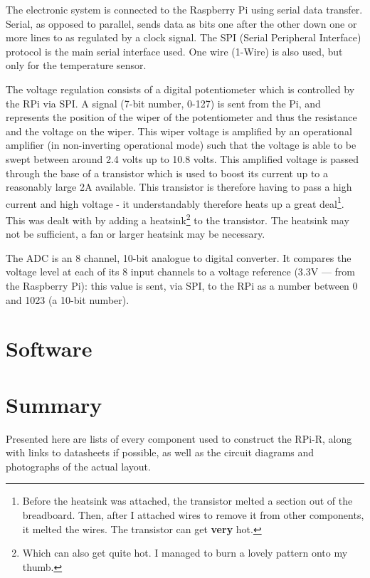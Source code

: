 \documentclass{report}
\begin{document}
			The electronic system is connected to the Raspberry Pi using serial data transfer. Serial, as opposed to parallel, sends data as bits one after the other down one or more lines to as regulated by a clock signal. The SPI (Serial Peripheral Interface) protocol is the main serial interface used. One wire (1-Wire) is also used, but only for the temperature sensor.
			
			The voltage regulation consists of a digital potentiometer which is controlled by the RPi via SPI. A signal (7-bit number, 0-127) is sent from the Pi, and represents the position of the wiper of the potentiometer and thus the resistance and the voltage on the wiper. This wiper voltage is amplified by an operational amplifier (in non-inverting operational mode) such that the voltage is able to be swept between around 2.4 volts up to 10.8 volts. This amplified voltage is passed through the base of a transistor which is used to boost its current up to a reasonably large 2A available. This transistor is therefore having to pass a high current and high voltage - it understandably therefore heats up a great deal\footnote{Before the heatsink was attached, the transistor melted a section out of the breadboard. Then, after I attached wires to remove it from other components, it melted the wires. The transistor can get \textbf{very} hot.}. This was dealt with by adding a heatsink\footnote{Which can also get quite hot. I managed to burn a lovely pattern onto my thumb.} to the transistor. The heatsink may not be sufficient, a fan or larger heatsink may be necessary.
			
			The ADC is an 8 channel, 10-bit analogue to digital converter. It compares the voltage level at each of its 8 input channels to a voltage reference (3.3V --- from the Raspberry Pi): this value is sent, via SPI, to the RPi as a number between 0 and 1023 (a 10-bit number).
			
		
		\section{Software}
		
		\section{Summary}
		
			Presented here are lists of every component used to construct the RPi-R, along with links to datasheets if possible, as well as the circuit diagrams and photographs of the actual layout.
	
\end{document}
